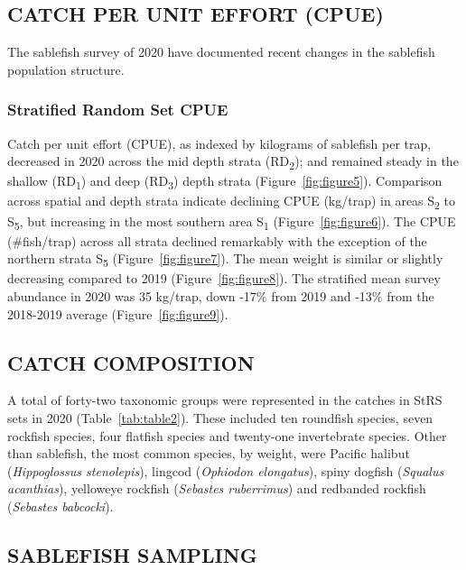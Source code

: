 \documentclass[12pt]{article}\usepackage[]{graphicx}\usepackage[]{color}
\begin{document}
\hypertarget{catch-per-unit-effort-cpue}{%
\subsection{CATCH PER UNIT EFFORT (CPUE)}\label{catch-per-unit-effort-cpue}}

The sablefish survey of 2020 have documented recent changes in the sablefish population structure.

\hypertarget{stratified-random-set-cpue}{%
\subsubsection{Stratified Random Set CPUE}\label{stratified-random-set-cpue}}

Catch per unit effort (CPUE), as indexed by kilograms of sablefish per trap, decreased in 2020 across the mid depth strata (RD\textsubscript{2}); and remained steady in the shallow (RD\textsubscript{1}) and deep (RD\textsubscript{3}) depth strata (Figure~\ref{fig:figure5}). Comparison across spatial and depth strata indicate declining CPUE (kg/trap) in areas S\textsubscript{2} to S\textsubscript{5}, but increasing in the most southern area S\textsubscript{1} (Figure~\ref{fig:figure6}). The CPUE (\#fish/trap) across all strata declined remarkably with the exception of the northern strata S\textsubscript{5} (Figure~\ref{fig:figure7}). The mean weight is similar or slightly decreasing compared to 2019 (Figure~\ref{fig:figure8}). The stratified mean survey abundance in 2020 was 35 kg/trap, down -17\% from 2019 and -13\% from the 2018-2019 average (Figure~\ref{fig:figure9}).

\hypertarget{catch-composition}{%
\subsection{CATCH COMPOSITION}\label{catch-composition}}

A total of forty-two taxonomic groups were represented in the catches in StRS sets in 2020 (Table~\ref{tab:table2}). These included ten roundfish species, seven rockfish species, four flatfish species and twenty-one invertebrate species. Other than sablefish, the most common species, by weight, were Pacific halibut (\emph{Hippoglossus stenolepis}), lingcod (\emph{Ophiodon elongatus}), spiny dogfish (\emph{Squalus acanthias}), yelloweye rockfish (\emph{Sebastes ruberrimus}) and redbanded rockfish (\emph{Sebastes babcocki}).

\hypertarget{sablefish-sampling}{%
\subsection{SABLEFISH SAMPLING}\label{sablefish-sampling}}
\end{document}
